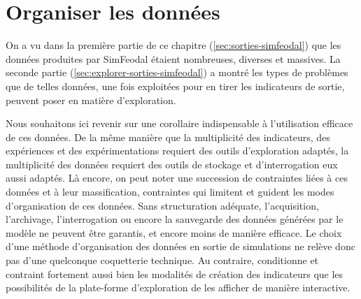 \clearpage
\section{Organiser les données}\label{sec:organiser-donnees}

On a vu dans la première partie de ce chapitre (\cref{sec:sorties-simfeodal}) que les données produites par SimFeodal étaient nombreuses, diverses et massives.
La seconde partie (\cref{sec:explorer-sorties-simfeodal}) a montré les types de problèmes que de telles données, une fois exploitées pour en tirer les indicateurs de sortie, peuvent poser en matière d'exploration.

Nous souhaitons ici revenir sur une corollaire indispensable à l'utilisation efficace de ces données.
De la même manière que la multiplicité des indicateurs, des expériences et des expérimentations requiert des outils d'exploration adaptés, la multiplicité des données requiert des outils de stockage et d'interrogation eux aussi adaptés.
Là encore, on peut noter une succession de contraintes liées à ces données et à leur massification, contraintes qui limitent et guident les modes d'organisation de ces données.
Sans structuration adéquate, l'acquisition, l'archivage, l'interrogation ou encore la sauvegarde des données générées par le modèle ne peuvent être garantis, et encore moins de manière efficace.
Le choix d'une méthode d'organisation des données en sortie de simulations ne relève donc pas d'une quelconque coquetterie technique.
Au contraire, conditionne et contraint fortement aussi bien les modalités de création des indicateurs que les possibilités de la plate-forme d'exploration de les afficher de manière interactive.

%
%




